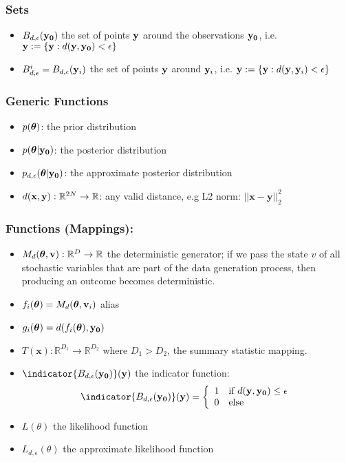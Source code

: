 \subsubsection*{Sets}
\label{sec:sets}

\begin{itemize}
\item $B_{d,\epsilon}(\mathbf{y_0})$ the set of points $\mathbf{y}$ around the observations $\mathbf{y_0}$, i.e. $\mathbf{y} := \{\mathbf{y}: d(\mathbf{y}, \mathbf{y_0}) < \epsilon \}$
\item $B_{d,\epsilon}^i = B_{d,\epsilon}(\mathbf{y}_i)$ the set of points $\mathbf{y}$ around $\mathbf{y}_i$, i.e. $\mathbf{y} := \{\mathbf{y}: d(\mathbf{y}, \mathbf{y}_i) < \epsilon \}$
\end{itemize}
    
\subsubsection*{Generic Functions}
\label{sec:generic-functions}

\begin{itemize}
\item $p(\boldsymbol{\theta})$: the prior distribution
\item $p(\boldsymbol{\theta}|\mathbf{y_0})$: the posterior distribution
\item $p_{d,\epsilon}(\boldsymbol{\theta}|\mathbf{y_0})$: the approximate posterior distribution
\item $d(\mathbf{x}, \mathbf{y}): \mathbb{R}^{2N} \rightarrow \mathbb{R}$: any valid distance, e.g L2 norm: $||\mathbf{x}-\mathbf{y}||_2^2$
\end{itemize}

\subsubsection*{Functions (Mappings):}
\label{sec:functions-mappings}

\begin{itemize}
\item $M_d(\boldsymbol{\theta}, \mathbf{v}): \mathbb{R}^D \rightarrow \mathbb{R}$ the deterministic generator; if we pass the state $v$ of all stochastic variables that are part of the data generation process, then producing an outcome becomes deterministic.
\item $f_i(\boldsymbol{\theta}) = M_d(\boldsymbol{\theta}, \mathbf{v}_i)$ alias

\item $g_i(\boldsymbol{\theta}) = d(f_i(\boldsymbol{\theta}), \mathbf{y_0})$
\item $T(\mathbf{x}): \mathbb{R}^{D_1} \rightarrow \mathbb{R}^{D_2}$ where $D_1 > D_2$, the summary statistic mapping.
\item  $\indicator{\region(\data)}(\yb)$ the indicator function:
    \begin{gather*}\indicator{\region(\data)}(\yb) = \left\{
	\begin{array}{ll}
		1 & \mbox{if } d(\yb,\data) \leq \epsilon \\
		0 & \mbox{else } 
	\end{array} \right. \end{gather*}

\item $L(\theta)$ the likelihood function
\item $L_{d,\epsilon}(\theta)$ the approximate likelihood function
\end{itemize}   
